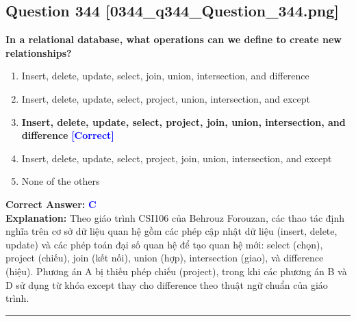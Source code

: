 \documentclass[11pt,a4paper]{article}
\begin{document}
\begin{minipage}{\textwidth}
\subsection*{Question 344 \quad \footnotesize{[0344\_q344\_Question\_344.png]}}
\noindent \textbf{In a relational database, what operations can we define to create new relationships?}

\begin{enumerate}[label=\Alph*.]
    \item Insert, delete, update, select, join, union, intersection, and difference
    \item Insert, delete, update, select, project, union, intersection, and except
    \item \textbf{Insert, delete, update, select, project, join, union, intersection, and difference} \hfill \textcolor{blue}{\textbf{[Correct]}}
    \item Insert, delete, update, select, project, join, union, intersection, and except
    \item None of the others
\end{enumerate}

\noindent \textbf{Correct Answer:} \textcolor{blue}{\textbf{C}} \\[2pt]
\noindent \textbf{Explanation:} Theo giáo trình CSI106 của Behrouz Forouzan, các thao tác định nghĩa trên cơ sở dữ liệu quan hệ gồm các phép cập nhật dữ liệu (insert, delete, update) và các phép toán đại số quan hệ để tạo quan hệ mới: select (chọn), project (chiếu), join (kết nối), union (hợp), intersection (giao), và difference (hiệu). Phương án A bị thiếu phép chiếu (project), trong khi các phương án B và D sử dụng từ khóa except thay cho difference theo thuật ngữ chuẩn của giáo trình.

\par\vspace{0.3cm}
\hrule
\vspace{0.3cm}
\end{minipage}
\end{document}
